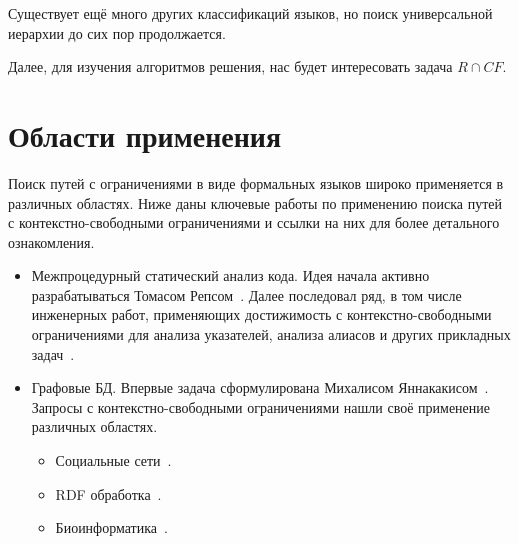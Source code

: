 Существует ещё много других классификаций языков, но поиск универсальной иерархии до сих пор продолжается.

Далее, для изучения алгоритмов решения, нас будет интересовать задача $R \cap CF$.

\section{Области применения}

Поиск путей с ограничениями в виде формальных языков широко применяется в различных областях.
Ниже даны ключевые работы по применению поиска путей с контекстно-свободными ограничениями и ссылки на них для более детального ознакомления.
\begin{itemize}
    \item Межпроцедурный статический анализ кода.
          Идея начала активно разрабатываться Томасом Репсом~.
          Далее последовал ряд, в том числе инженерных работ, применяющих достижимость с контекстно-свободными ограничениями для анализа указателей, анализа алиасов и других прикладных задач~.
    \item Графовые БД.
          Впервые задача сформулирована Михалисом Яннакакисом~.
          Запросы с контекстно-свободными ограничениями нашли своё применение различных областях.
          \begin{itemize}
              \item Социальные сети~.
              \item RDF обработка~.
              \item Биоинформатика~.
          \end{itemize}
\end{itemize}




